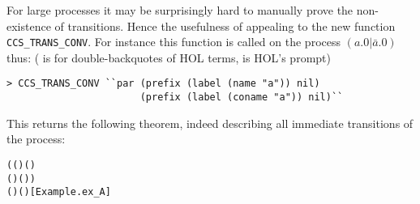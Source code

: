 For large processes it may be surprisingly hard to manually prove the
non-existence of transitions.  Hence the usefulness of appealing to 
the new  function \texttt{CCS\_TRANS\_CONV}. 
For instance this function
is called on the  process $(a.0 | \bar{a}.0)$ thus:
(\mbox{} is for double-backquotes of HOL
  terms, \mbox{\color{blue}{\texttt{>}}} is HOL's prompt)
\begin{lstlisting}
> CCS_TRANS_CONV ``par (prefix (label (name "a")) nil)
                       (prefix (label (coname "a")) nil)``
\end{lstlisting}
This returns the following theorem, indeed describing all immediate
transitions of the process:
\begin{alltt}
\HOLTokenTurnstile{}   \HOLSymConst{\ensuremath{\parallel}}   \HOLTokenTransBegin{}\HOLTokenTransEnd {} \HOLSymConst{\HOLTokenEquiv{}}
   (( \HOLSymConst{=}  ) \HOLSymConst{\HOLTokenConj{}} ( \HOLSymConst{=}  \HOLSymConst{\ensuremath{\parallel}}  ) \HOLSymConst{\HOLTokenDisj{}}
    ( \HOLSymConst{=}  ) \HOLSymConst{\HOLTokenConj{}} ( \HOLSymConst{=}   \HOLSymConst{\ensuremath{\parallel}} )) \HOLSymConst{\HOLTokenDisj{}}
   ( \HOLSymConst{=} \HOLSymConst{\ensuremath{\tau}}) \HOLSymConst{\HOLTokenConj{}} ( \HOLSymConst{=}  \HOLSymConst{\ensuremath{\parallel}} )\hfill{[Example.ex_A]}
\end{alltt}

